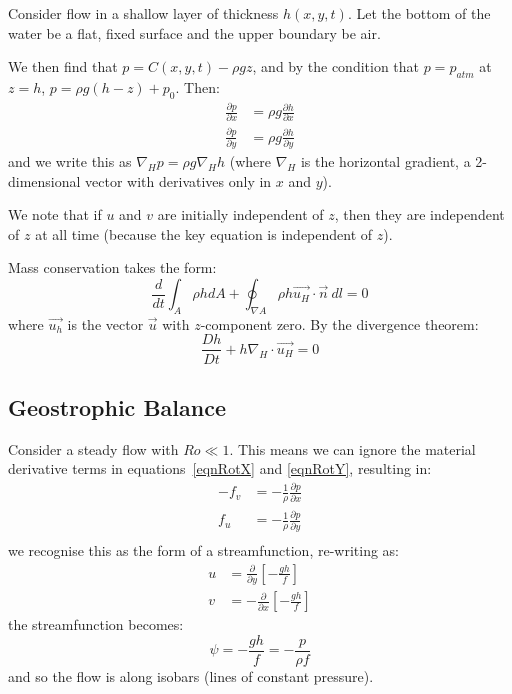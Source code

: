 \documentclass[../Main.tex]{subfiles}
\begin{document}
\begin{example}
    Consider flow in a shallow layer of thickness $h(x, y, t)$. Let the bottom of the water be a flat, fixed surface and the upper boundary be air.

    We then find that $p = C(x, y, t) - \rho g z$, and by the condition that $p = p_{atm}$ at $z = h$, $p = \rho g(h - z) + p_0$. Then:
    \begin{align*}
        \frac{\partial p}{\partial x} &= \rho g \frac{\partial h}{\partial x} \\
        \frac{\partial p}{\partial y} &= \rho g \frac{\partial h}{\partial y}
    \end{align*}
    and we write this as $\nabla_H p = \rho g \nabla_H h$ (where $\nabla_H$ is the horizontal gradient, a 2-dimensional vector with derivatives only in $x$ and $y$).

    We note that if $u$ and $v$ are initially independent of $z$, then they are independent of $z$ at all time (because the key equation is independent of $z$).

    Mass conservation takes the form:
    \begin{equation*}
        \frac{d}{dt} \int_A \rho h dA + \oint_{\nabla A} \rho h \vec{u_H} \cdot \vec{n}~dl = 0
    \end{equation*}
    where $\vec{u_h}$ is the vector $\vec{u}$ with $z$-component zero. By the divergence theorem:
    \begin{equation*}
        \frac{D h}{D t} + h \nabla_H \cdot \vec{u_H} = 0
    \end{equation*}
\end{example}
\subsection{Geostrophic Balance}
Consider a steady flow with $Ro \ll 1$. This means we can ignore the material derivative terms in equations~\ref{eqnRotX} and \ref{eqnRotY}, resulting in:
\begin{align*}
    -f_v &= -\frac1\rho \frac{\partial p}{\partial x} \\
    f_u &= -\frac1\rho \frac{\partial p}{\partial y} \\
\end{align*}
we recognise this as the form of a streamfunction, re-writing as:
\begin{align*}
    u &= \frac{\partial}{\partial y} \left[-\frac{gh}{f}\right] \\
    v &= -\frac{\partial}{\partial x} \left[-\frac{gh}{f}\right]
\end{align*}
the streamfunction becomes:
\begin{equation*}
    \psi = -\frac{gh}{f} = -\frac{p}{\rho f}
\end{equation*}
and so the flow is along isobars (lines of constant pressure).
\end{document}
